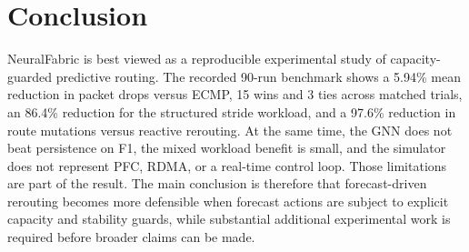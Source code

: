 \documentclass[conference]{IEEEtran}
\begin{document}
\section{Conclusion}
NeuralFabric is best viewed as a reproducible experimental study of capacity-guarded predictive routing. The recorded 90-run benchmark shows a 5.94\% mean reduction in packet drops versus ECMP, 15 wins and 3 ties across matched trials, an 86.4\% reduction for the structured stride workload, and a 97.6\% reduction in route mutations versus reactive rerouting. At the same time, the GNN does not beat persistence on F1, the mixed workload benefit is small, and the simulator does not represent PFC, RDMA, or a real-time control loop. Those limitations are part of the result. The main conclusion is therefore that forecast-driven rerouting becomes more defensible when forecast actions are subject to explicit capacity and stability guards, while substantial additional experimental work is required before broader claims can be made.
\end{document}
